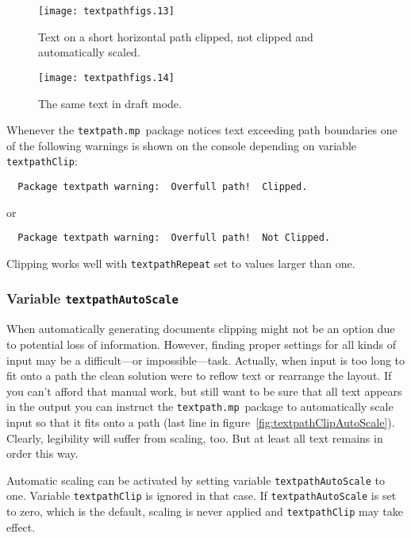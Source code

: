 \documentclass{article}
\newcommand*{\cmd}[1]{\texttt{#1}}
\newcommand*{\pkg}{\cmd{textpath.mp}}
\begin{document}
\begin{figure}
\begin{minipage}[t]{.45\linewidth}
  \centering
  \texttt{[image: textpathfigs.13]}
  \caption{Text on a short horizontal path clipped, not clipped and automatically scaled.}
  \label{fig:textpathClipAutoScale}
\end{minipage}\hfill
\begin{minipage}[t]{.45\linewidth}
  \centering
  \texttt{[image: textpathfigs.14]}
  \caption{The same text in draft mode.}
  \label{fig:textpathDraft}
\end{minipage}
\end{figure}

Whenever the \pkg\ package notices text exceeding path boundaries one of the following warnings is shown on the console depending on variable \cmd{textpathClip}:

\begin{verbatim}
  Package textpath warning:  Overfull path!  Clipped.
\end{verbatim}
or
\begin{verbatim}
  Package textpath warning:  Overfull path!  Not Clipped.
\end{verbatim}

Clipping works well with \cmd{textpathRepeat} set to values larger than one.


\subsubsection{Variable \cmd{textpathAutoScale}}
When automatically generating documents clipping might not be an option due to potential loss of information.  However, finding proper settings for all kinds of input may be a difficult---or impossible---task.  Actually, when input is too long to fit onto a path the clean solution were to reflow text or rearrange the layout.  If you can't afford that manual work, but still want to be sure that all text appears in the output you can instruct the \pkg\ package to automatically scale input so that it fits onto a path (last line in figure~\ref{fig:textpathClipAutoScale}).  Clearly, legibility will suffer from scaling, too.  But at least all text remains in order this way.

Automatic scaling can be activated by setting variable \cmd{textpathAutoScale} to one.  Variable \cmd{textpathClip} is ignored in that case.  If \cmd{textpathAutoScale} is set to zero, which is the default, scaling is never applied and \cmd{textpathClip} may take effect.
\end{document}
